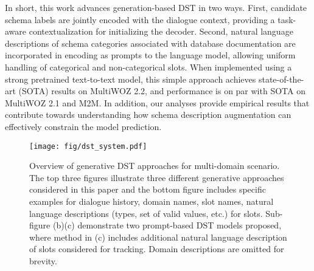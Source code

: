 \documentclass[11pt]{article}
\begin{document}
In short, this work advances generation-based DST in two ways.  First, candidate schema labels are jointly encoded with the dialogue context, providing a task-aware contextualization for initializing the decoder.  Second, natural language descriptions of schema categories associated with database documentation are incorporated in encoding as prompts to the language model, allowing uniform handling of categorical and non-categorical slots. When implemented using a strong pretrained text-to-text model, this simple approach achieves state-of-the-art (SOTA) results on MultiWOZ 2.2, and performance is on par with SOTA on MultiWOZ 2.1 and M2M. In addition, our analyses provide empirical results that contribute towards understanding how schema description augmentation can effectively constrain the model prediction.  



\begin{comment}
Out contributions are three fold:
\begin{itemize}
    \item We propose a prompt-based generative approach for DST by leveraging sequence-to-sequence pretrained language models. This allows jointly encoding the dialogue context and schema-specific information.
    \item The schema of task-oriented dialogue features abbreviated and under-specified slot names. This reduces the effectiveness of language models which are pretrained on web text. To alleviate this issue, we incorporate natural language schema descriptions into the prompts of language models. 
    \item Experimental results show that our prompt-based approach achieve SOTA on MultiWOZ 2.2 and is on par with SOTA on MultiWOZ 2.1 and M2M. The extensive analysis shows that schema description augmentation can effectively constrain the model prediction.  
\end{itemize}
\end{comment}


\begin{figure*}[t!]
    \centering
    \texttt{[image: fig/dst\_system.pdf]}
    \caption{Overview of generative DST approaches for multi-domain scenario. The top three figures illustrate three different generative approaches considered in this paper and the bottom figure includes specific examples for dialogue history, domain names, slot names, natural language descriptions (types, set of valid values, etc.) for slots. Sub-figure (b)(c) demonstrate two prompt-based DST models proposed, where method in (c) includes additional natural language description of slots considered for tracking. Domain descriptions are omitted for brevity.}
    \label{fig:system}
\end{figure*} 
\end{document}
